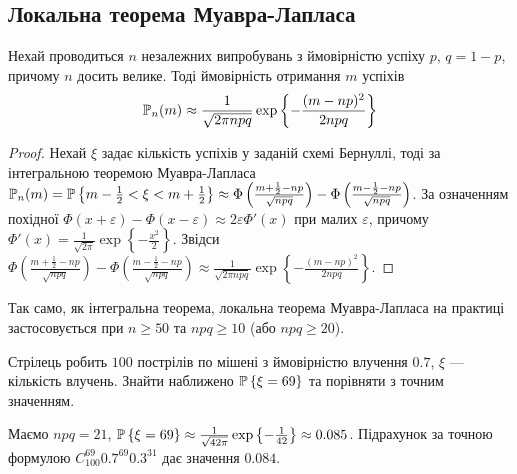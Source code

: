 \subsection{Локальна теорема Муавра-Лапласа}
\begin{theorem*}
    Нехай проводиться $n$ незалежних випробувань з ймовірністю успіху $p$, $q = 1-p$, причому $n$ досить велике.
    Тоді ймовірність отримання $m$ успіхів 
    \begin{gather}
        \P_n(m) \approx \frac{1}{\sqrt{2\pi n p q}} \exp \left\{ - \frac{(m - np)^2}{2npq}\right\}
    \end{gather}
\end{theorem*}
\begin{proof}
    Нехай $\xi$ задає кількість успіхів у заданій схемі Бернуллі, тоді за інтегральною теоремою Муавра-Лапласа
    $\P_n(m) = \P\left\{ m-\frac{1}{2} < \xi < m+\frac{1}{2}\right\} \approx 
    \Phi\left(\frac{m+\frac{1}{2}- np}{\sqrt{n p q}}\right) - \Phi\left(\frac{m-\frac{1}{2} - np}{\sqrt{n p q}}\right)$.
    За означенням похідної $\Phi(x + \varepsilon) - \Phi(x - \varepsilon) \approx 2 \varepsilon \Phi'(x)$ при малих $\varepsilon$,
    причому $\Phi'(x) = \frac{1}{\sqrt{2\pi}} \exp \left\{ - \frac{x^2}{2}\right\}$.
    Звідси 
    $\Phi\left(\frac{m+\frac{1}{2}- np}{\sqrt{n p q}}\right) - \Phi\left(\frac{m-\frac{1}{2} - np}{\sqrt{n p q}}\right) \approx
    \frac{1}{\sqrt{2\pi n p q}} \exp \left\{ - \frac{(m - np)^2}{2npq}\right\}$.
\end{proof}
\begin{remark}
    Так само, як інтегральна теорема, локальна теорема Муавра-Лапласа на практиці застосовується при $n \geq 50$ та $npq \geq 10$ (або $npq \geq 20$).
\end{remark}
\begin{example}
    Стрілець робить $100$ пострілів по мішені з ймовірністю влучення $0.7$, $\xi$ --- кількість влучень. Знайти наближено
    $\P\left\{ \xi = 69\right\}$ та порівняти з точним значенням.

    \noindent Маємо $npq = 21$, $\P\left\{ \xi = 69\right\} \approx \frac{1}{\sqrt{42\pi}} \exp\left\{ -\frac{1}{42}\right\} \approx 0.085$.
    Підрахунок за точною формулою $C_{100}^{69} 0.7^{69} 0.3^{31}$ дає значення $0.084$.
\end{example}

